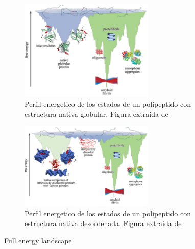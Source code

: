 \begin{figure}[ht!]
\centering
\begin{subfigure}[ht]{\linewidth}
\includegraphics[width=0.7\textwidth]{img/globularEnLandscape.png} 
\centering
\caption{Perfil energetico de los estados de un polipeptido con estructura nativa globular. Figura extraida de \cite{turoverov2010protein}}
\label{globularFullEnLandscape}
\end{subfigure}

\begin{subfigure}[ht]{\linewidth}
\centering
\includegraphics[width=0.7\textwidth]{img/idpEnLandscape.png} 
\caption{Perfil energetico de los estados de un polipeptido con estructura nativa desordenada. Figura extraida de \cite{turoverov2010protein}}
\label{idpFullEnLandscape}
\end{subfigure}
 \caption{Full energy landscape}
 \label{fullEnLandscape}
\end{figure}




